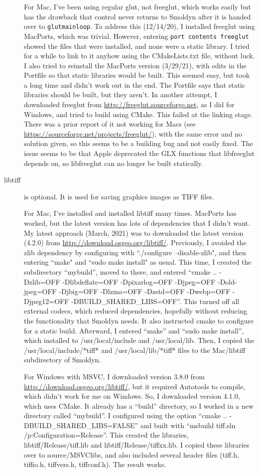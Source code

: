 \documentclass {scrbook}
\newcommand {\ttt} {\texttt}
\begin{document}
\begin{description}
For Mac, I've been using regular glut, not freeglut, which works easily but has the drawback that control never returns to Smoldyn after it is handed over to \ttt{glutmainloop}. To address this (12/14/20), I installed freeglut using MacPorts, which was trivial. However, entering \ttt{port contents freeglut} showed the files that were installed, and none were a static library. I tried for a while to link to it anyhow using the CMakeLists.txt file, without luck. I also tried to reinstall the MacPorts version (3/29/21), with edits in the Portfile so that static libraries would be built. This seemed easy, but took a long time and didn't work out in the end. The Portfile says that static libraries should be built, but they aren't. In another attempt, I downloaded freeglut from \url{http://freeglut.sourceforge.net}, as I did for Windows, and tried to build using CMake. This failed at the linking stage. There was a prior report of it not working for Macs (see \url{https://sourceforge.net/projects/freeglut/}), with the same error and no solution given, so this seems to be a building bug and not easily fixed. The issue seems to be that Apple deprecated the GLX functions that libfreeglut depends on, so libfreeglut can no longer be built statically.

\item[libtiff] is optional. It is used for saving graphics images as TIFF files.

For Mac, I've installed and installed libtiff many times. MacPorts has worked, but the latest version has lots of dependencies that I didn't want. My latest approach (March, 2021) was to downloaded the latest version (4.2.0) from \url{http://download.osgeo.org/libtiff/}. Previously, I avoided the zlib dependency by configuring with ``./configure --disable-zlib", and then entering ``make" and ``sudo make install" as usual. This time, I created the subdirectory ``mybuild'', moved to there, and entered ``cmake .. -Dzlib=OFF -Dlibdeflate=OFF -Dpixarlog=OFF -Djpeg=OFF -Dold-jpeg=OFF -Djbig=OFF -Dlzma=OFF -Dzstd=OFF -Dwebp=OFF -Djpeg12=OFF -DBUILD\_SHARED\_LIBS=OFF''. This turned off all external codecs, which reduced dependencies, hopefully without reducing the functionality that Smoldyn needs. It also instructed cmake to configure for a static build. Afterward, I entered ``make'' and ``sudo make install'', which installed to /usr/local/include and /usr/local/lib. Then, I copied the /usr/local/include/*tiff* and /usr/local/lib/*tiff* files to the Mac/libtiff subdirectory of Smoldyn.

For Windows with MSVC, I downloaded version 3.8.0 from \url{http://download.osgeo.org/libtiff/}, but it required Autotools to compile, which didn't work for me on Windows. So, I downloaded version 4.1.0, which uses CMake. It already has a ``build'' directory, so I worked in a new directory called ``mybuild''. I configured using the option ``cmake .. -DBUILD\_SHARED\_LIBS=FALSE'' and built with ``msbuild tiff.sln /p:Configuration=Release''. This created the libraries, libtiff/Release/tiff.lib and libtiff/Release/tiffxx.lib. I copied these libraries over to source/MSVClibs, and also included several header files (tiff.h, tiffio.h, tiffvers.h, tiffconf.h). The result works.


\end{description}
\end{document}
